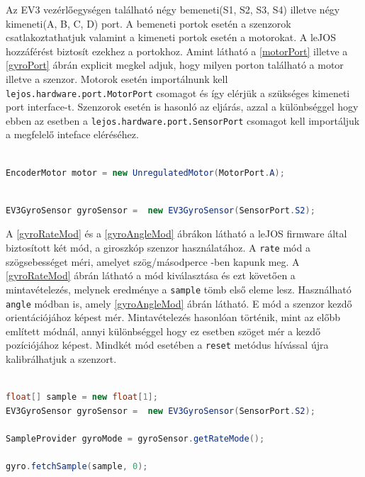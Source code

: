 Az EV3 vezérlőegységen található négy bemeneti(S1, S2, S3, S4) illetve négy kimeneti(A, B, C, D) port. A bemeneti portok esetén a szenzorok csatlakoztathatjuk valamint a kimeneti portok esetén a motorokat. A leJOS hozzáférést biztosít ezekhez a portokhoz. Amint látható a \ref{motorPort} illetve a \ref{gyroPort} ábrán explicit megkel adjuk, hogy milyen porton található a motor illetve a szenzor. Motorok esetén importálnunk kell \texttt{lejos.hardware.port.MotorPort} csomagot és így elérjük a szükséges kimeneti port interface-t. Szenzorok esetén is hasonló az eljárás, azzal a különbséggel hogy ebben az esetben a \texttt{lejos.hardware.port.SensorPort} csomagot kell importáljuk a megfelelő inteface eléréséhez. 


\begin{lstlisting}[label=motorPort, caption= Az \texttt{A} porton keresztül hozzáférés a motorhoz, language=Java]

EncoderMotor motor = new UnregulatedMotor(MotorPort.A);

\end{lstlisting}

\begin{lstlisting}[label=gyroPort, caption= Az \texttt{S2} porton keresztük hozzáférés a giroszkop szenzorhoz, language=Java]

EV3GyroSensor gyroSensor =  new EV3GyroSensor(SensorPort.S2);

\end{lstlisting}

A \ref{gyroRateMod} és a \ref{gyroAngleMod} ábrákon látható a leJOS firmware által biztosított két mód, a giroszkóp szenzor használatához. A \texttt{rate} mód a szögsebességet méri, amelyet szög/másodperce -ben kapunk meg. A \ref{gyroRateMod} ábrán látható a mód kiválasztása és ezt követően a mintavételezés, melynek eredménye a \texttt{sample} tömb első eleme lesz. Használható \texttt{angle} módban is, amely \ref{gyroAngleMod} ábrán látható. E mód a szenzor kezdő orientációjához képest mér. Mintavételezés hasonlóan történik, mint az előbb említett módnál, annyi különbséggel hogy ez esetben szöget mér a kezdő pozíciójához képest. Mindkét mód esetében a \texttt{reset} metódus hívással újra kalibrálhatjuk a szenzort.

\begin{lstlisting}[label=gyroRateMod, caption= Giroszkóp szenzor \texttt{rate} mód használata, language=Java]

float[] sample = new float[1];
EV3GyroSensor gyroSensor =  new EV3GyroSensor(SensorPort.S2);

SampleProvider gyroMode = gyroSensor.getRateMode();

gyro.fetchSample(sample, 0);

\end{lstlisting}

